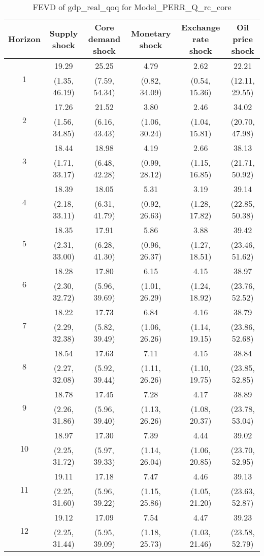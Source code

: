 \documentclass{article}
\begin{document}
\begin{table}
	\footnotesize
	\caption{FEVD of gdp_real_qoq for Model_PERR_Q_rc_core}
	\begin{tabular}{cccccc}
		Horizon & Supply shock & Core demand shock & Monetary shock & Exchange rate shock & Oil price shock\\ \hline
		\multirow{2}{*}{1} & 19.29 & 25.25 & 4.79 & 2.62 & 22.21\\
		 & (1.35, 46.19) & (7.59, 54.34) & (0.82, 34.09) & (0.54, 15.36) & (12.11, 29.55)\\
		\multirow{2}{*}{2} & 17.26 & 21.52 & 3.80 & 2.46 & 34.02\\
		 & (1.56, 34.85) & (6.16, 43.43) & (1.06, 30.24) & (1.04, 15.81) & (20.70, 47.98)\\
		\multirow{2}{*}{3} & 18.44 & 18.98 & 4.19 & 2.66 & 38.13\\
		 & (1.71, 33.17) & (6.48, 42.28) & (0.99, 28.12) & (1.15, 16.85) & (21.71, 50.92)\\
		\multirow{2}{*}{4} & 18.39 & 18.05 & 5.31 & 3.19 & 39.14\\
		 & (2.18, 33.11) & (6.31, 41.79) & (0.92, 26.63) & (1.28, 17.82) & (22.85, 50.38)\\
		\multirow{2}{*}{5} & 18.35 & 17.91 & 5.86 & 3.88 & 39.42\\
		 & (2.31, 33.00) & (6.28, 41.30) & (0.96, 26.37) & (1.27, 18.51) & (23.46, 51.62)\\
		\multirow{2}{*}{6} & 18.28 & 17.80 & 6.15 & 4.15 & 38.97\\
		 & (2.30, 32.72) & (5.96, 39.69) & (1.01, 26.29) & (1.24, 18.92) & (23.76, 52.52)\\
		\multirow{2}{*}{7} & 18.22 & 17.73 & 6.84 & 4.16 & 38.79\\
		 & (2.29, 32.38) & (5.82, 39.49) & (1.06, 26.26) & (1.14, 19.15) & (23.86, 52.68)\\
		\multirow{2}{*}{8} & 18.54 & 17.63 & 7.11 & 4.15 & 38.84\\
		 & (2.27, 32.08) & (5.92, 39.44) & (1.11, 26.26) & (1.10, 19.75) & (23.85, 52.85)\\
		\multirow{2}{*}{9} & 18.78 & 17.45 & 7.28 & 4.17 & 38.89\\
		 & (2.26, 31.86) & (5.96, 39.40) & (1.13, 26.26) & (1.08, 20.37) & (23.78, 53.04)\\
		\multirow{2}{*}{10} & 18.97 & 17.30 & 7.39 & 4.44 & 39.02\\
		 & (2.25, 31.72) & (5.97, 39.33) & (1.14, 26.04) & (1.06, 20.85) & (23.70, 52.95)\\
		\multirow{2}{*}{11} & 19.11 & 17.18 & 7.47 & 4.46 & 39.13\\
		 & (2.25, 31.60) & (5.96, 39.22) & (1.15, 25.86) & (1.05, 21.20) & (23.63, 52.87)\\
		\multirow{2}{*}{12} & 19.12 & 17.09 & 7.54 & 4.47 & 39.23\\
		 & (2.25, 31.44) & (5.95, 39.09) & (1.18, 25.73) & (1.03, 21.46) & (23.58, 52.79)\\
	\end{tabular}
\label{tab:fevd-Model_PERR_Q_rc_core-gdp_real_qoq}
\end{table}
\end{document}

